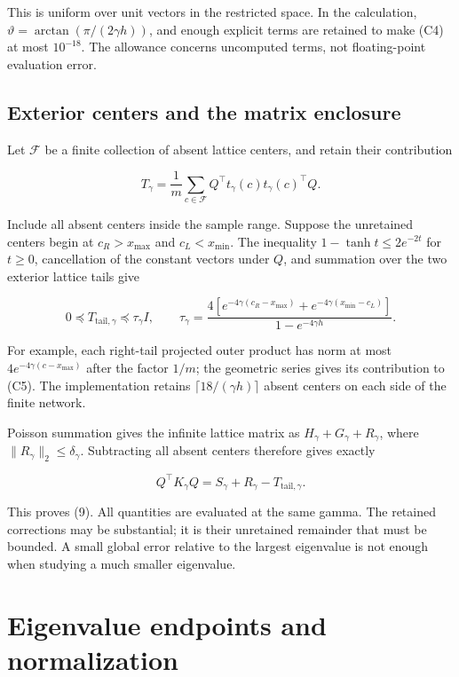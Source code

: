 \documentclass[11pt]{article}
\begin{document}
This is uniform over unit vectors in the restricted space. In the calculation, \(\vartheta=\arctan(\pi/(2\gamma h))\), and enough explicit terms are retained to make (C4) at most \(10^{-18}\). The allowance concerns uncomputed terms, not floating-point evaluation error.

\subsection{Exterior centers and the matrix enclosure}

Let \(\mathcal F\) be a finite collection of absent lattice centers, and retain their contribution

\[
T_\gamma=\frac1m\sum_{c\in\mathcal F}
Q^\top t_\gamma(c)t_\gamma(c)^\top Q.
\]

Include all absent centers inside the sample range. Suppose the unretained centers begin at \(c_R>x_{\max}\) and \(c_L<x_{\min}\). The inequality \(1-\tanh t\le2e^{-2t}\) for \(t\ge0\), cancellation of the constant vectors under \(Q\), and summation over the two exterior lattice tails give

\[
0\preceq T_{\mathrm{tail},\gamma}\preceq\tau_\gamma I,
\qquad
\tau_\gamma=
\frac{4[e^{-4\gamma(c_R-x_{\max})}+e^{-4\gamma(x_{\min}-c_L)}]}
{1-e^{-4\gamma h}}.
\tag{C5}
\]

For example, each right-tail projected outer product has norm at most \(4e^{-4\gamma(c-x_{\max})}\) after the factor \(1/m\); the geometric series gives its contribution to (C5). The implementation retains \(\lceil18/(\gamma h)\rceil\) absent centers on each side of the finite network.

Poisson summation gives the infinite lattice matrix as \(H_\gamma+G_\gamma+R_\gamma\), where \(\|R_\gamma\|_2\le\delta_\gamma\). Subtracting all absent centers therefore gives exactly

\[
Q^\top K_\gamma Q
=S_\gamma+R_\gamma-T_{\mathrm{tail},\gamma}.
\]

This proves (9). All quantities are evaluated at the same gamma. The retained corrections may be substantial; it is their unretained remainder that must be bounded. A small global error relative to the largest eigenvalue is not enough when studying a much smaller eigenvalue.

\section{Eigenvalue endpoints and normalization}
\end{document}
